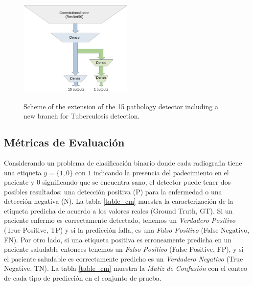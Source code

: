 {\begin{figure}[htp]
    \centering
    {\includegraphics[width=0.5\textwidth]{Chapters/4. ViT-Lung/images/tb_net.pdf}}
\caption{Scheme of the extension of the 15 pathology detector including a new branch for Tuberculosis detection.}
\label{net_tb}
\end{figure}


\subsection{Métricas de Evaluación}

Considerando un problema de clasificación binario donde cada radiografia tiene una etiqueta
$y = \{1, 0\}$ con $1$ indicando la presencia del padecimiento en el paciente y $0$ significando
que se encuentra sano, el detector puede tener dos posibles resultados: una detección positiva (P)
para la enfermedad o una detección negativa (N). La tabla \ref{table_cm} muestra la caracterización
de la etiqueta predicha de acuerdo a los valores reales (Ground Truth, GT). Si un paciente enfermo
es correctamente detectado, tenemos un \textit{Verdadero Positivo} (True Positive, TP) y si la
predicción falla, es una \textit{Falso Positivo} (False Negativo, FN). Por otro lado, si una etiqueta
positiva es erroneamente predicha en un paciente saludable entonces tenemos un \textit{Falso Positivo}
(False Positive, FP), y si el paciente saludable es correctamente predicho es un
\textit{Verdadero Negativo} (True Negative, TN). La tabla \ref{table_cm} muestra la \textit{Matiz de
Confusión} con el conteo de cada tipo de predicción en el conjunto de prueba.

}
